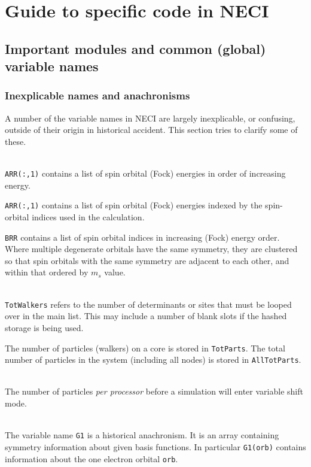 \documentclass[a4paper,notitlepage]{scrreprt}
\newcommand\headitem[1]{\needspace{1.5\baselineskip}\item[{\boldmath #1 \nopagebreak}] \hfill \\ \nopagebreak}
\let\code\lstinline
\begin{document}
{{{%

\chapter{Guide to specific code in NECI}

\section{Important modules and common (global) variable names}
\label{sect:cons-types}

\subsection{Inexplicable names and anachronisms}
	A number of the variable names in NECI are largely inexplicable, or
	confusing, outside of their origin in historical accident. This section
	tries to clarify some of these.

	\begin{description}
		\headitem{ARR, BRR}
			\code{ARR(:,1)} contains a list of spin orbital (Fock)
			energies in	order of increasing energy.

			\code{ARR(:,1)} contains a list of spin orbital (Fock)
			energies indexed by the spin-orbital indices used in the
			calculation.

			\code{BRR} contains a list of spin orbital indices in
			increasing (Fock) energy order. Where multiple degenerate orbitals
			have the same symmetry, they are clustered so that spin orbitals
			with the same symmetry are adjacent to each other, and within that
			ordered by $m_s$ value.

		\headitem{TotWalkers and TotParts}
			\code{TotWalkers} refers to the number of determinants or
			sites that must be looped over in the main list. This may include
			a number of blank slots if the hashed storage is being used.

			The number of particles (walkers) on a core is stored in
			\code{TotParts}. The total number of particles in the system
			(including all nodes) is stored in \code{AllTotParts}.

		\headitem{InitWalkers}
			The number of particles \emph{per processor} before a simulation
			will enter variable shift mode.

		\headitem{G1}
			The variable name \code{G1} is a historical anachronism. It
			is an array containing symmetry information about given basis
			functions. In particular \code{G1(orb)} contains information
			about the one electron orbital \code{orb}.


\end{description}}}}
\end{document}
